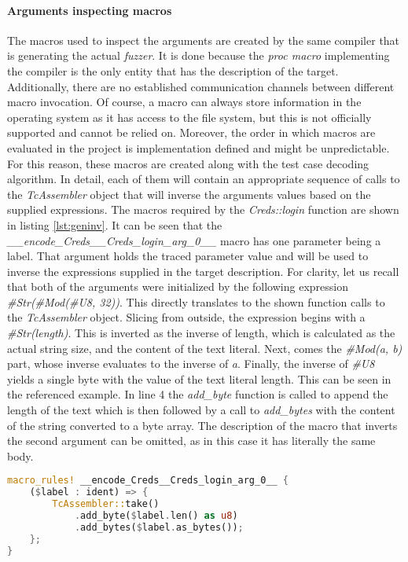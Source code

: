 \paragraph{Arguments inspecting macros}
The macros used to inspect the arguments are created by the same compiler that is generating the actual \textit{fuzzer}. It is done because the \textit{proc macro} implementing the compiler is the only entity that has the description of the target. Additionally, there are no established communication channels between different macro invocation. Of course, a macro can always store information in the operating system as it has access to the file system, but this is not officially supported and cannot be relied on. Moreover, the order in which macros are evaluated in the project is implementation defined and might be unpredictable. For this reason, these macros are created along with the test case decoding algorithm. In detail, each of them will contain an appropriate sequence of calls to the \textit{TcAssembler} object that will inverse the arguments values based on the supplied expressions. The macros required by the \textit{Creds::login} function are shown in listing \ref{lst:geninv}. It can be seen that the \textit{\_\_encode\_Creds\_\_Creds\_login\_arg\_0\_\_} macro has one parameter being a label. That argument holds the traced parameter value and will be used to inverse the expressions supplied in the target description. For clarity, let us recall that both of the arguments were initialized by the following expression \textit{\#Str(\#Mod(\#U8, 32))}. This directly translates to the shown function calls to the \textit{TcAssembler} object. Slicing from outside, the expression begins with a \textit{\#Str(length)}. This is inverted as the inverse of length, which is calculated as the actual string size, and the content of the text literal. Next, comes the \textit{\#Mod(a, b)} part, whose inverse evaluates to the inverse of \textit{a}. Finally, the inverse of \textit{\#U8} yields a single byte with the value of the text literal length. This can be seen in the referenced example. In line 4 the \textit{add\_byte} function is called to append the length of the text which is then followed by a call to \textit{add\_bytes} with the content of the string converted to a byte array. The description of the macro that inverts the second argument can be omitted, as in this case it has literally the same body.

\begin{minipage}{\linewidth}
\begin{lstlisting}[language=rust,caption={Generated macros which inverse the arguments},label={lst:geninv}]
macro_rules! __encode_Creds__Creds_login_arg_0__ {
    ($label : ident) => {
        TcAssembler::take()
            .add_byte($label.len() as u8)
            .add_bytes($label.as_bytes());
    };
}
\end{lstlisting}
\end{minipage}

